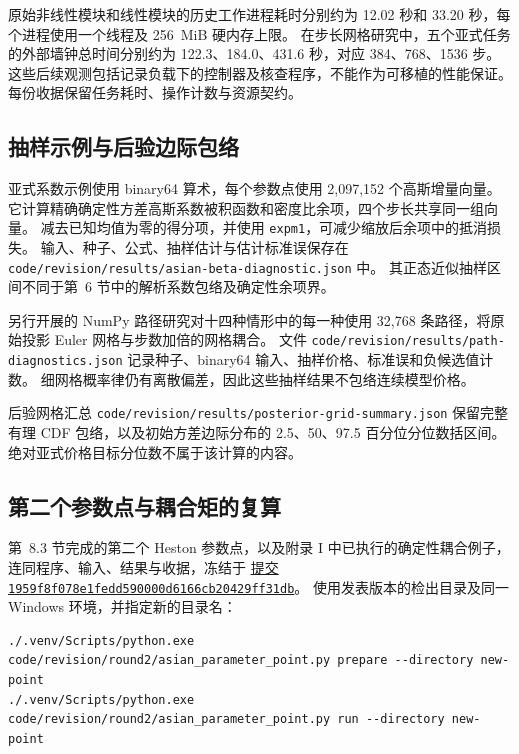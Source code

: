 原始非线性模块和线性模块的历史工作进程耗时分别约为 12.02 秒和 33.20 秒，每个进程使用一个线程及 256~MiB 硬内存上限。
在步长网格研究中，五个亚式任务的外部墙钟总时间分别约为 122.3、184.0、431.6 秒，对应 384、768、1536 步。
这些后续观测包括记录负载下的控制器及核查程序，不能作为可移植的性能保证。
每份收据保留任务耗时、操作计数与资源契约。



\subsection{抽样示例与后验边际包络}


亚式系数示例使用 binary64 算术，每个参数点使用 2,097,152 个高斯增量向量。
它计算精确确定性方差高斯系数被积函数和密度比余项，四个步长共享同一组向量。
减去已知均值为零的得分项，并使用 \texttt{expm1}，可减少缩放后余项中的抵消损失。
输入、种子、公式、抽样估计与估计标准误保存在 \texttt{code/revision/results/asian-beta-diagnostic.json} 中。
其正态近似抽样区间不同于第~6 节中的解析系数包络及确定性余项界。

另行开展的 NumPy 路径研究对十四种情形中的每一种使用 32,768 条路径，将原始投影 Euler 网格与步数加倍的网格耦合。
文件 \texttt{code/revision/results/path-diagnostics.json} 记录种子、binary64 输入、抽样价格、标准误和负候选值计数。
细网格概率律仍有离散偏差，因此这些抽样结果不包络连续模型价格。

后验网格汇总 \texttt{code/revision/results/posterior-grid-summary.json} 保留完整有理 CDF 包络，以及初始方差边际分布的 2.5、50、97.5 百分位分位数括区间。
绝对亚式价格目标分位数不属于该计算的内容。


\subsection{第二个参数点与耦合矩的复算}

第~8.3 节完成的第二个 Heston 参数点，以及附录 I 中已执行的确定性耦合例子，连同程序、输入、结果与收据，冻结于
\href{https://github.com/130U/certified-valuation-arithmetic-asian-options/tree/1959f8f078e1fedd590000d6166cb20429ff31db}{提交 \texttt{1959f8f078e1fedd590000d6166cb20429ff31db}}。
使用发表版本的检出目录及同一 Windows 环境，并指定新的目录名：

\begin{verbatim}
./.venv/Scripts/python.exe code/revision/round2/asian_parameter_point.py prepare --directory new-point
./.venv/Scripts/python.exe code/revision/round2/asian_parameter_point.py run --directory new-point
\end{verbatim}

